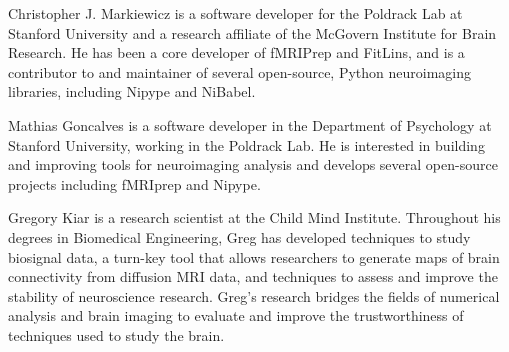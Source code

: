 \documentclass[lettersize,journal]{IEEEtran}
\begin{document}
\begin{IEEEbiography}{Christopher J. Markiewicz}
  is a software developer for the Poldrack Lab at Stanford University and a research affiliate of the McGovern Institute for Brain Research. He has been a core developer of fMRIPrep and FitLins, and is a contributor to and maintainer of several open-source, Python neuroimaging libraries, including Nipype and NiBabel.
\end{IEEEbiography}

\begin{IEEEbiography}{Mathias Goncalves}
  is a software developer in the Department of Psychology at Stanford University, working in the Poldrack Lab. He is interested in building and improving tools for neuroimaging analysis and develops several open-source projects including fMRIprep and Nipype.
\end{IEEEbiography}

\begin{IEEEbiography}{Gregory Kiar} is a research scientist at the Child Mind Institute. Throughout his
  degrees in Biomedical Engineering, Greg has developed techniques to study
  biosignal data, a turn-key tool that allows researchers to generate maps of
  brain connectivity from diffusion MRI data, and techniques to assess and
  improve the stability of neuroscience research. Greg’s research bridges
  the fields of numerical analysis and brain imaging to evaluate and improve
  the trustworthiness of techniques used to study the brain.
\end{IEEEbiography}
\end{document}
